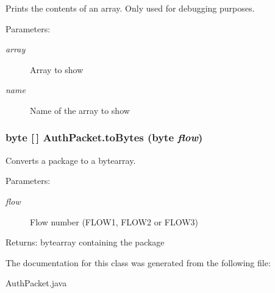 Prints the contents of an array. Only used for debugging purposes. \begin{Desc}
\item[Parameters:]
\begin{description}
\item[{\em array}]Array to show \item[{\em name}]Name of the array to show \end{description}
\end{Desc}
\hypertarget{class_auth_packet_c7}{
\subsubsection[toBytes]{\setlength{\rightskip}{0pt plus 5cm}byte \mbox{[}$\,$\mbox{]} Auth\-Packet.to\-Bytes (byte {\em flow})}}
\label{class_auth_packet_c7}


Converts a package to a bytearray. \begin{Desc}
\item[Parameters:]
\begin{description}
\item[{\em flow}]Flow number (FLOW1, FLOW2 or FLOW3) \end{description}
\end{Desc}
\begin{Desc}
\item[Returns:]bytearray containing the package \end{Desc}


The documentation for this class was generated from the following file:\begin{CompactItemize}
\item 
Auth\-Packet.java\end{CompactItemize}
